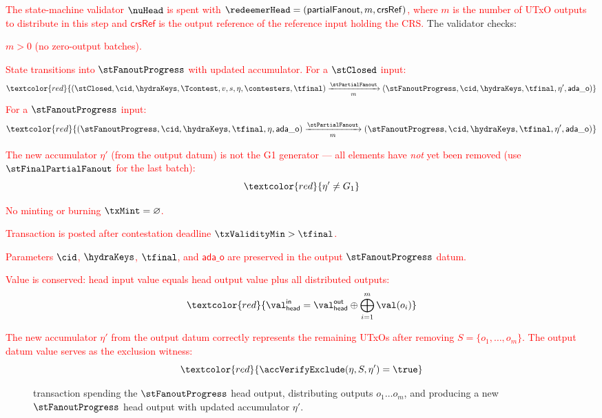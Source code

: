 \noindent \textcolor{red}{The state-machine validator $\nuHead$ is spent with
$\redeemerHead = (\mathsf{partialFanout}, m, \mathsf{crsRef})$, where $m$ is the number of UTxO outputs to distribute in this step and $\mathsf{crsRef}$ is the output reference of the reference input holding the CRS.}
The validator checks:
\begin{menumerate}
  \item \textcolor{red}{$m > 0$ (no zero-output batches).}
  \item \textcolor{red}{State transitions into $\stFanoutProgress$ with updated accumulator. For a $\stClosed$ input:}
  \[
	\textcolor{red}{(\stClosed,\cid,\hydraKeys,\Tcontest,v,s,\eta,\contesters,\tfinal) \xrightarrow[m]{\stPartialFanout} (\stFanoutProgress,\cid,\hydraKeys,\tfinal,\eta',\mathsf{ada\_o})}
  \]
  \textcolor{red}{For a $\stFanoutProgress$ input:}
  \[
	\textcolor{red}{(\stFanoutProgress,\cid,\hydraKeys,\tfinal,\eta,\mathsf{ada\_o}) \xrightarrow[m]{\stPartialFanout} (\stFanoutProgress,\cid,\hydraKeys,\tfinal,\eta',\mathsf{ada\_o})}
  \]
  \item \textcolor{red}{The new accumulator $\eta'$ (from the output datum) is not the G1 generator — all elements have \emph{not} yet been removed (use $\stFinalPartialFanout$ for the last batch):}
  \[
    \textcolor{red}{\eta' \neq G_1}
  \]
  \item \textcolor{red}{No minting or burning $\txMint = \varnothing$.}
  \item \textcolor{red}{Transaction is posted after contestation deadline $\txValidityMin > \tfinal$.}
  \item \textcolor{red}{Parameters $\cid$, $\hydraKeys$, $\tfinal$, and $\mathsf{ada\_o}$ are preserved in the output $\stFanoutProgress$ datum.}
  \item \textcolor{red}{Value is conserved: head input value equals head output value plus all distributed outputs:}
  \[
    \textcolor{red}{\val_{\mathsf{head}}^{\mathsf{in}} = \val_{\mathsf{head}}^{\mathsf{out}} \oplus \bigoplus_{i=1}^{m} \val(o_i)}
  \]
  \item \textcolor{red}{The new accumulator $\eta'$ from the output datum correctly represents the remaining UTxOs after removing $S = \{o_1, \ldots, o_m\}$. The output datum value serves as the exclusion witness:}
  \[
	\textcolor{red}{\accVerifyExclude(\eta, S, \eta') = \true}
  \]
\end{menumerate}

\begin{figure}[H]
  \centering
  
  \caption{\mtxPartialFanout{} transaction spending the $\stFanoutProgress$ head output,
    distributing outputs $o_{1} \dots o_{m}$, and producing a new $\stFanoutProgress$ head output with updated accumulator $\eta'$.}\label{fig:partialFanoutTx}
\end{figure}

